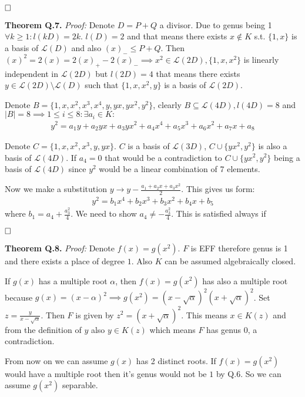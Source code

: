 \documentclass[12pt, a4paper]{article}
\newcommand{\qed}{\hfill\square}
\begin{document}
$\qed$

\textbf{Theorem Q.7.} \textit{Proof:}
Denote $D = P + Q$ a divisor. Due to genus being 1 $\forall k\geq 1: l(kD) = 2k$. $l(D)=2$ and that means there exists $x \notin K$ s.t. $\{1,x\}$ is a basis of $\mathcal{L}(D)$ and also $(x)_{-} \leq P+Q$. Then $(x)^2 = 2(x) = 2(x)_{+}-2(x)_{-} \implies x^2 \in \mathcal{L}(2D),\{1,x,x^2\}$ is linearly independent in $\mathcal{L}(2D)$ but $l(2D)=4$ that means there exists $y \in \mathcal{L}(2D)\setminus \mathcal{L}(D)$ such that $\{1,x,x^2,y\}$ is a basis of $\mathcal{L}(2D)$. 

Denote $B = \{1,x,x^2,x^3,x^4,y,yx,yx^2,y^2\}$, clearly $B \subseteq \mathcal{L}(4D), l(4D)=8$ and $|B|=8 \implies 1 \leq i \leq 8: \exists a_i \in K:$
\begin{gather*}
y^2 = a_1y + a_2yx + a_3yx^2 + a_4x^4 + a_5x^3 + a_6x^2 + a_7x+ a_8
\end{gather*}

Denote $C = \{1,x,x^2,x^3,y,yx\}$. $C$ is a basis of $\mathcal{L}(3D)$, $C \cup \{yx^2,y^2\}$ is also a basis of $\mathcal{L}(4D)$. If $a_4=0$ that would be a contradiction to $C \cup \{yx^2,y^2\}$ being a basis of $\mathcal{L}(4D)$ since $y^2$ would be a linear combination of 7 elements.

Now we make a substitution $y \rightarrow y - \frac{a_1+a_2x+a_3x^2}{2}$. This gives us form:
\begin{gather*}
y^2 =b_1x^4 + b_2x^3 + b_3x^2 + b_4x+ b_5
\end{gather*}
where $b_1 = a_4+\frac{a_3^2}{4}$. We need to show $a_4 \neq -\frac{a_3^2}{4}$. This is satisfied always if

$\qed$

\textbf{Theorem Q.8.} \textit{Proof:}
Denote $f(x) = g(x^2)$. $F$ is EFF therefore genus is 1 and there exists a place of degree $1$. Also $K$ can be assumed algebraically closed.

If $g(x)$ has a multiple root $\alpha$, then $f(x)=g(x^2)$ has also a multiple root because $g(x)=(x-\alpha)^2 \implies g(x^2) = (x-\sqrt{\alpha})^2(x+\sqrt{\alpha})^2$. Set $z = \frac{y}{x-\sqrt{\alpha}}$. Then $F$ is given by $z^2=(x+\sqrt{\alpha})^2$. This means $x \in K(z)$ and from the definition of $y$ also $y \in K(z)$ which means $F$ has genus 0, a contradiction.

From now on we can assume $g(x)$ has 2 distinct roots. If $f(x)=g(x^2)$ would have a multiple root then it's genus would not be $1$ by Q.6. So we can assume $g(x^2)$ separable. 
\end{document}
